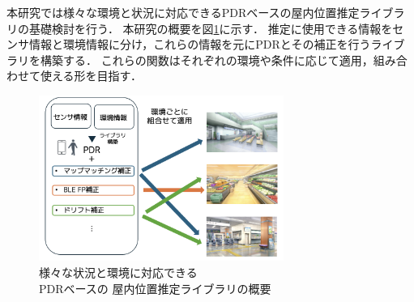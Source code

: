 本研究では様々な環境と状況に対応できるPDRベースの屋内位置推定ライブラリの基礎検討を行う．
本研究の概要を図\ref{fig:overview}に示す．
推定に使用できる情報をセンサ情報と環境情報に分け，これらの情報を元にPDRとその補正を行うライブラリを構築する．
これらの関数はそれぞれの環境や条件に応じて適用，組み合わせて使える形を目指す．

\begin{figure}[h]
	\centering
	\includegraphics[width=80mm]{image/first.png}
	\caption{様々な状況と環境に対応できる\\PDRベースの
		屋内位置推定ライブラリの概要}    \label{fig:overview}
\end{figure}



